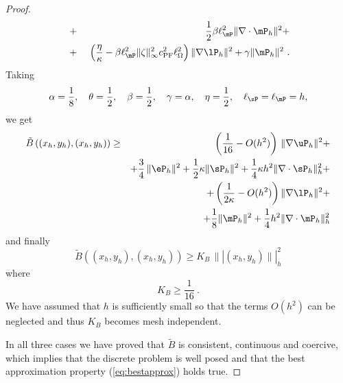 \begin{proof}
\begin{eqnarray}
		~&+&~\frac12 \beta \ell_{\mP}^2 \| \nabla \cdot \mP_h\|^2 + \nonumber \\
		~&+&~\left ( \frac{\eta}{\kappa}-\beta \ell_{\mP}^2 \|\zeta\|_{\infty}^2 c_{\mbox{\scriptsize{PF}}}^2 \ell_{\Omega}^2 \right ) \|\nabla \lP_h\|^2 + \gamma \|\mP_h\|^2~. \label{eq:Bhparams}
	\end{eqnarray}
	Taking
	\begin{equation}
	\alpha = \frac{1}{8}, \quad \theta=\frac12,\quad \beta=\frac12,
	\quad \gamma=\alpha, \quad \eta = \frac12,
	\quad \ell_{\sP} = \ell_{\mP} = h, \label{eq:paramsopt}
	\end{equation}
	we get
	\begin{eqnarray*}
		\tilde{B}\left ( (x_h,y_h),(x_h,y_h) \right ) &\geq  &
		\left ( \frac{1}{16} - O(h^2) \right )\, \|\nabla \uP_h\|^2+\\
		& & +\frac{3}{4}\,\|\eP_h\|^2+\frac12 \kappa \|\sP_h\|^2 + \frac14 \kappa h^2 \|\nabla \cdot \sP_h\|_h^2 + \\
		& &
		+\left (\frac{1}{2\kappa}  -O(h^2) \right ) \|\nabla \lP_h\|^2 + \\
		& & + \frac18 \|\mP_h\|^2  +\frac14 h^2 \|\nabla \cdot \mP_h\|_h^2 
	\end{eqnarray*}
	and finally
	\begin{equation}
		\tilde{B}\left ( (x_h,y_h),({x}_h,{y}_h) \right ) \geq 
		K_B \, \| |(x_h,y_h)  \| |_h^2 
	\end{equation}
	where
	\begin{equation}
		K_B \geq \frac{1}{16}~.
	\end{equation}
	We have assumed that $h$ is sufficiently small so that the terms $O(h^2)$ can be neglected and thus $K_B$ becomes mesh independent. 
	
	\bigskip
	
	In all three cases we have proved that $\tilde{B}$ is consistent, continuous and coercive, which implies that the discrete problem is well posed and that the best approximation property (\ref{eq:bestapprox}) holds true.
\end{proof}


